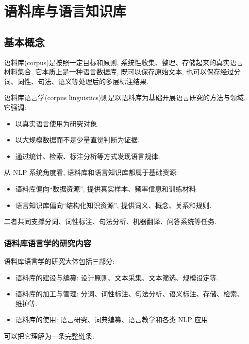 \chapter{语料库与语言知识库}


\section{基本概念}


语料库(corpus)是按照一定目标和原则, 系统性收集、整理、存储起来的真实语言材料集合.
它本质上是一种语言数据库, 既可以保存原始文本, 也可以保存经过分词、词性、句法、语义等处理后的多层标注结果.

语料库语言学(corpus linguistics)则是以语料库为基础开展语言研究的方法与领域.
它强调:

\begin{itemize}
\item 以真实语言使用为研究对象.
\item 以大规模数据而不是少量直觉判断为证据.
\item 通过统计、检索、标注分析等方式发现语言规律.
\end{itemize}

从 NLP 系统角度看, 语料库和语言知识库都属于基础资源:

\begin{itemize}
\item 语料库偏向“数据资源”, 提供真实样本、频率信息和训练材料.
\item 语言知识库偏向“结构化知识资源”, 提供词义、概念、关系和规则.
\end{itemize}

二者共同支撑分词、词性标注、句法分析、机器翻译、问答系统等任务.

\subsection{语料库语言学的研究内容}


语料库语言学的研究大体包括三部分:

\begin{itemize}
\item 语料库的建设与编纂: 设计原则、文本采集、文本筛选、规模设定等.
\item 语料库的加工与管理: 分词、词性标注、句法分析、语义标注、存储、检索、维护等.
\item 语料库的使用: 语言研究、词典编纂、语言教学和各类 NLP 应用.
\end{itemize}

可以把它理解为一条完整链条:

